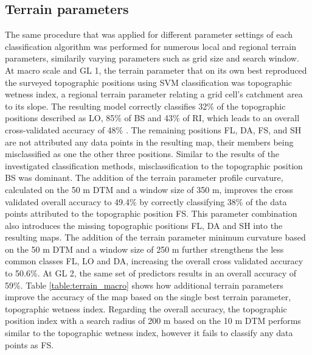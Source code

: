 \documentclass[preprint,12pt,authoryear]{elsarticle}
\begin{document}
\subsection{Terrain parameters}
The same procedure that was applied for different parameter settings of each classification algorithm was performed for  numerous local and regional terrain parameters, similarily varying parameters such as grid size and search window. At macro scale and GL 1, the terrain parameter that on its own best reproduced the surveyed topographic positions using SVM classification was topographic wetness index, a regional terrain parameter relating a grid cell's catchment area to its slope. The resulting model correctly classifies 32\% of the topographic positions described as LO, 85\% of BS and 43\% of RI, which leads to an overall cross-validated accuracy of 48\% . The remaining positions FL, DA, FS, and SH are not attributed any data points in the resulting map, their members being misclassified as one the other three positions. Similar to the results of the investigated classification methods, misclassification to the topographic position BS was dominant. The addition of the terrain parameter profile curvature, calculated on the 50 m DTM and a window size of 350 m, improves the cross validated overall accuracy to 49.4\% by correctly classifying 38\% of the data points attributed to the topographic position FS. This parameter combination also introduces the missing topographic positions FL, DA and SH into the resulting maps. The addition of the terrain parameter minimum curvature based on the 50 m DTM and a window size of 250 m further strengthens the less common classes FL, LO and DA, increasing the overall cross validated accuracy to 50.6\%. At GL 2, the same set of predictors results in an overall accuracy of 59\%. Table \ref{table:terrain_macro} shows how additional terrain parameters improve the accuracy of the map based on the single best terrain parameter, topographic wetness index. Regarding the overall accuracy, the topographic position index with a search radius of 200 m based on the 10 m DTM performs similar to the topographic wetness index, however it fails to classify any data points as FS. 
\end{document}
